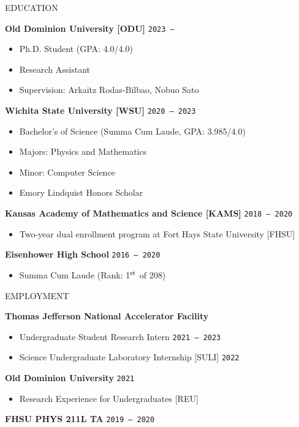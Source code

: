 \documentclass[10pt,a4paper]{article}
\def\bline{\vspace*{0.2cm}}
\newcommand\datetf[2]{\texttt{#1\,--\,#2}}
\newcommand\datei[1]{\texttt{#1}}
\newenvironment{cvsection}[1]
{
{\LARGE #1} \hrulefill
\vspace*{3ex}
}
{
\vspace*{3ex}
}
\begin{document}
\begin{cvsection}{EDUCATION}

\textbf{Old Dominion University [ODU]} \hfill \datetf{2023}{\phantom{2023}}
\begin{itemize}[nosep,leftmargin=*]
    \item[--] Ph.D. Student (GPA: 4.0/4.0)
    \item[--] Research Assistant
    \item[--] Supervision: Arkaitz Rodas-Bilbao, Nobuo Sato
\end{itemize}
%
\bline
%
\textbf{Wichita State University [WSU]} \hfill \datetf{2020}{2023}
\begin{itemize}[nosep,leftmargin=*]
    \item[--] Bachelor's of Science (Summa Cum Laude, GPA: 3.985/4.0)
    \item[--] Majors: Physics and Mathematics
    \item[--] Minor: Computer Science
    \item[--] Emory Lindquist Honors Scholar
\end{itemize}
%
\bline
%
\textbf{Kansas Academy of Mathematics and Science [KAMS]} \hfill \datetf{2018}{2020}
\begin{itemize}[nosep,leftmargin=*,label=$-$]
    \item Two-year dual enrollment program at Fort Hays State University [FHSU]
\end{itemize}
%
\bline
%
\textbf{Eisenhower High School} \hfill \datetf{2016}{2020}
\begin{itemize}[nosep,leftmargin=*,label=$-$]
    \item Summa Cum Laude (Rank: 1$^{\rm st}$ of 208)
\end{itemize}

\end{cvsection}

\begin{cvsection}{EMPLOYMENT}


\textbf{Thomas Jefferson National Accelerator Facility}
\begin{itemize}[nosep,leftmargin=*,label=$-$]
    \item Undergraduate Student Research Intern \hfill \datetf{2021}{2023}
    \item Science Undergraduate Laboratory Internship [SULI] \hfill \datei{2022}
\end{itemize}
%
\bline
%
\textbf{Old Dominion University} \hfill \datei{2021}
\begin{itemize}[nosep,leftmargin=*,label=$-$]
    \item Research Experience for Undergraduates [REU]
\end{itemize}
%
\bline
%
\textbf{FHSU PHYS 211L TA} \hfill \datetf{2019}{2020}

\end{cvsection}
\end{document}
